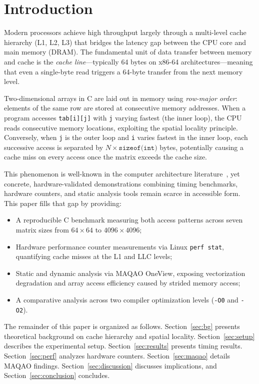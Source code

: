 \documentclass[conference]{IEEEtran}
\begin{document}
\section{Introduction}

Modern processors achieve high throughput largely through a multi-level cache
hierarchy (L1, L2, L3) that bridges the latency gap between the CPU core and
main memory (DRAM). The fundamental unit of data transfer between memory and
cache is the \textit{cache line}---typically 64 bytes on x86-64
architectures---meaning that even a single-byte read triggers a 64-byte
transfer from the next memory level.

Two-dimensional arrays in C are laid out in memory using \textit{row-major
order}: elements of the same row are stored at consecutive memory addresses.
When a program accesses \texttt{tab[i][j]} with \texttt{j} varying fastest
(the inner loop), the CPU reads consecutive memory locations, exploiting the
spatial locality principle. Conversely, when \texttt{j} is the outer loop and
\texttt{i} varies fastest in the inner loop, each successive access is
separated by $N \times \texttt{sizeof(int)}$ bytes, potentially causing a
cache miss on every access once the matrix exceeds the cache size.

This phenomenon is well-known in the computer architecture
literature~\cite{hennessy2017}, yet concrete, hardware-validated demonstrations
combining timing benchmarks, hardware counters, and static analysis tools remain
scarce in accessible form. This paper fills that gap by providing:

\begin{itemize}
  \item A reproducible C benchmark measuring both access patterns across seven
        matrix sizes from $64 \times 64$ to $4096 \times 4096$;
  \item Hardware performance counter measurements via Linux \texttt{perf stat},
        quantifying cache misses at the L1 and LLC levels;
  \item Static and dynamic analysis via MAQAO OneView, exposing vectorization
        degradation and array access efficiency caused by strided memory access;
  \item A comparative analysis across two compiler optimization levels
        (\texttt{-O0} and \texttt{-O2}).
\end{itemize}

The remainder of this paper is organized as follows.
Section~\ref{sec:bg} presents theoretical background on cache hierarchy and
spatial locality. Section~\ref{sec:setup} describes the experimental setup.
Section~\ref{sec:results} presents timing results. Section~\ref{sec:perf}
analyzes hardware counters. Section~\ref{sec:maqao} details MAQAO findings.
Section~\ref{sec:discussion} discusses implications, and
Section~\ref{sec:conclusion} concludes.
\end{document}

